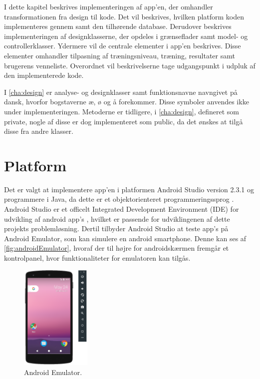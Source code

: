 I dette kapitel beskrives implementeringen af app'en, der omhandler transformationen fra design til kode. Det vil beskrives, hvilken platform koden implementeres gennem samt den tilhørende database. Derudover beskrives implementeringen af designklasserne, der opdeles i grænseflader samt model- og controllerklasser. Ydermere vil de centrale elementer i app'en beskrives. Disse elementer omhandler tilpasning af træningsniveau, træning, resultater samt brugerens venneliste. Overordnet vil beskrivelserne tage udgangspunkt i udpluk af den implementerede kode.

I \autoref{cha:design} er analyse- og designklasser samt funktionsnavne navngivet på dansk, hvorfor bogstaverne æ, ø og å forekommer. Disse symboler anvendes ikke under implementeringen. Metoderne er tidligere, i \autoref{cha:design}, defineret som private, nogle af disse er dog implementeret som public, da det ønskes at tilgå disse fra andre klasser. 

\section{Platform}
Det er valgt at implementere app'en i platformen Android Studio version 2.3.1 og programmere i Java, da dette er et objektorienteret programmeringssprog \cite{Brahma2015}. Android Studio er et officelt Integrated Development Environment (IDE) for udvikling af android app's \cite{android2017}, hvilket er passende for udviklingenen af dette projekts problemløsning. Dertil tilbyder Android Studio at teste app's på Android Emulator, som kan simulere en android smartphone. Denne kan ses af \autoref{fig:androidEmulator}, hvoraf der til højre for androidskærmen fremgår et kontrolpanel, hvor funktionaliteter for emulatoren kan tilgås. 

\begin{figure} [H]
\centering
\includegraphics[width=0.3\textwidth]{figures/emulator}
\caption{Android Emulator.}
\label{fig:androidEmulator}
\end{figure}

